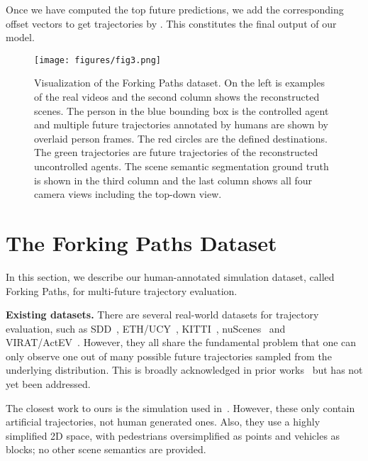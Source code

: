 \documentclass[10pt,twocolumn,letterpaper]{article}
\begin{document}
Once we have computed the top  future predictions,
we add the corresponding offset vectors to get
 trajectories by .
This constitutes the final output of our model.  
\begin{figure*}[!t]
	\centering
	    \vspace{-4mm}
		\texttt{[image: figures/fig3.png]}
		\vspace{-7mm}
	\caption{Visualization of the Forking Paths dataset. On the left is examples of the real videos and the second column shows the reconstructed scenes. The person in the blue bounding box is the controlled agent and multiple future trajectories annotated by humans are shown by overlaid person frames. 
The red circles are the defined destinations. The green trajectories are future trajectories of the reconstructed uncontrolled agents. The scene semantic segmentation ground truth is shown in the third column and the last column shows all four camera views including the top-down view.} \label{fig:dataset}
	\vspace{-6mm}
\end{figure*}

\vspace{-1mm}
\section{The Forking Paths Dataset}
\label{sec:dataset}
\vspace{-1mm}

In this section, we describe our human-annotated simulation dataset, called Forking Paths, for multi-future trajectory evaluation.

\noindent\textbf{Existing datasets.}
There are several real-world datasets for trajectory evaluation,
such as SDD~\cite{robicquet2016learning}, ETH/UCY~\cite{pellegrini2010improving,lerner2007crowds}, KITTI~\cite{geiger2013vision}, nuScenes~\cite{caesar2019nuscenes} and VIRAT/ActEV~\cite{2018trecvidawad,oh2011large}.
However, they all share the fundamental problem
that
one can only observe one out of many possible future trajectories sampled from the underlying distribution. This is broadly acknowledged in prior works~\cite{makansi2019overcoming,thiede2019analyzing,chai2019multipath,gupta2018social,rhinehart2019precog,rhinehart2018r2p2} but has not yet been addressed. 

The closest work to ours is the simulation used in~\cite{makansi2019overcoming, thiede2019analyzing,chai2019multipath}.
However,
these only contain artificial trajectories,
not human generated ones.
Also, they use a highly simplified  2D space, with pedestrians oversimplified as points and vehicles as blocks; no other scene semantics are provided.
\end{document}
